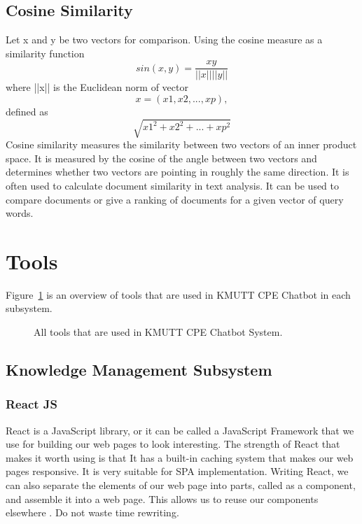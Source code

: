 \documentclass[12pt,oneside,openright,a4paper]{cpe-english-project}
\begin{document}
\subsection{Cosine Similarity}
Let x and y be two vectors for comparison. Using the cosine measure as a similarity function
\[sin(x,y) = \frac{xy}{||x||||y||}\]
where ||x|| is the Euclidean norm of vector
\[x =(x1, x2, ..., xp),\] defined as \[\sqrt{x1^2+x2^2+...+xp^2}\]
Cosine similarity measures the similarity between two vectors of an inner product space. It is measured by the cosine of the angle between two vectors and determines whether two vectors are pointing in roughly the same direction. It is often used to calculate document similarity in text analysis. It can be used to compare documents or give a ranking of documents for a given vector of query words.

\section{Tools}
Figure~\ref*{fig:ch3_tools} is an overview of tools that are used in KMUTT CPE Chatbot in each subsystem.
\begin{figure}[h!]
  \centering
  \setlength{\fboxrule}{0.2mm}
  \setlength{\fboxsep}{0.5cm}
  \caption{All tools that are used in KMUTT CPE Chatbot System.}
  \label{fig:ch3_tools}
\end{figure}

\subsection{Knowledge Management Subsystem}
\subsubsection{React JS}
React is a JavaScript library, or it can be called a JavaScript Framework that we use for building
our web pages to look interesting. The strength of React that makes it worth using is that It has
a built-in caching system that makes our web pages responsive. It is very suitable for SPA
implementation. Writing React, we can also separate the elements of our web page into parts,
called as a component, and assemble it into a web page. This allows us to reuse our components
elsewhere \cite{what_is_react}. Do not waste time rewriting.
\end{document}
